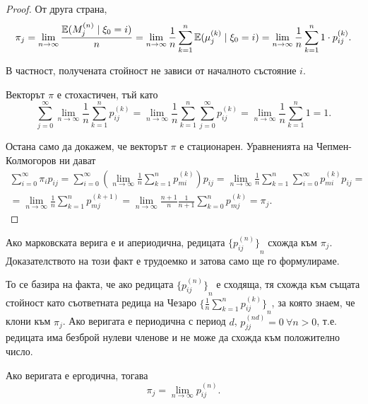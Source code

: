 \documentclass[numbers=endperiod, DIV=15, bibliography=totocnumbered]{scrartcl}
\begin{document}
\begin{proof}
  От друга страна,
  \begin{displaymath}
    \pi_j
    =
    \lim_{n \to \infty} \frac {\mathbb{E}(M^{(n)}_j \mid \xi_0 = i)} n
    =
    \lim_{n \to \infty} \frac 1 n \sum_{k=1}^n \mathbb{E}(\mu^{(k)}_j \mid \xi_0 = i)
    =
    \lim_{n \to \infty} \frac 1 n \sum_{k=1}^n 1 \cdot p_{ij}^{(k)}.
  \end{displaymath}

  В частност, получената стойност не зависи от началното състояние $i$.

  Векторът $\pi$ е стохастичен, тъй като
  \begin{displaymath}
    \sum_{j=0}^\infty \lim_{n \to \infty} \frac 1 n \sum_{k=1}^n p_{ij}^{(k)}
    =
    \lim_{n \to \infty} \frac 1 n \sum_{k=1}^n \sum_{j=0}^\infty p_{ij}^{(k)}
    =
    \lim_{n \to \infty} \frac 1 n \sum_{k=1}^n 1
    =
    1.
  \end{displaymath}

  Остана само да докажем, че векторът $\pi$ е стационарен. Уравненията на Чепмен-Колмогоров ни дават
  \begin{multline*}
    \sum_{i=0}^\infty \pi_i p_{ij}
    =
    \sum_{i=0}^\infty \left( \lim_{n \to \infty} \frac 1 n \sum_{k=1}^n p_{mi}^{(k)} \right) p_{ij}
    =
    \lim_{n \to \infty} \frac 1 n \sum_{k=1}^n \sum_{i=0}^\infty p_{mi}^{(k)} p_{ij}
    = \\ =
    \lim_{n \to \infty} \frac 1 n \sum_{k=1}^n p_{mj}^{(k+1)}
    =
    \lim_{n \to \infty} \frac {n+1} n \frac 1 {n+1} \sum_{k=0}^n p_{mj}^{(k)}
    =
    \pi_j.
  \end{multline*}
\end{proof}

Ако марковската верига е и апериодична, редицата ${\{ p_{ij}^{(n)} \}}_n$ схожда към $\pi_j$. Доказателството на този факт е трудоемко и затова само ще го формулираме.

То се базира на факта, че ако редицата ${\{ p_{ij}^{(n)} \}}_n$ е сходяща, тя схожда към същата стойност като съответната редица на Чезаро ${\{ \frac 1 n \sum_{k=1}^n p_{ij}^{(k)} \}}_n$, за която знаем, че клони към $\pi_j$. Ако веригата е периодична с период $d$, $p_{jj}^{(nd)} = 0~\forall n > 0$, т.е. редицата има безброй нулеви членове и не може да схожда към положително число.

\begin{corollary}
  Ако веригата е ергодична, тогава
  \begin{displaymath}
    \pi_j = \lim_{n \to \infty} p_{ij}^{(n)}.
  \end{displaymath}
\end{corollary}
\end{document}
